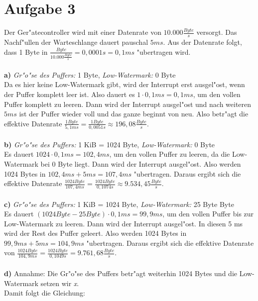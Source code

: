 \documentclass{ti2}
\begin{document}
\section*{Aufgabe 3}
Der Ger"atecontroller wird mit einer Datenrate von $10.000 \frac{Byte}{s}$ versorgt. Das Nachf"ullen der Warteschlange dauert pauschal $5ms$. Aus der Datenrate folgt, dass 1 Byte in $\frac{Byte}{10.000 \frac{Byte}{s}}=0,0001s=0,1ms$ "ubertragen wird.\\ 
\\
\textbf{a)} \textit{Gr"o"se des Puffers:} 1 Byte,     \textit{Low-Watermark:} 0 Byte\\
Da es hier keine Low-Watermark gibt, wird der Interrupt erst ausgel"ost, wenn der Puffer komplett leer ist. Also dauert es $1 \cdot 0,1ms=0,1ms$, um den vollen Puffer komplett zu leeren. Dann wird der Interrupt ausgel"ost und nach weiteren $5ms$ ist der Puffer wieder voll und das ganze beginnt von neu. Also betr"agt die effektive Datenrate $\frac{1 Byte}{5,1 ms}=\frac{1 Byte}{0,0051s}\approx 196,08 \frac{Byte}{s}$.\\ 
\\
\textbf{b)} \textit{Gr"o"se des Puffers:} 1 KiB = 1024 Byte,    \textit{Low-Watermark:} 0 Byte\\
Es dauert $1024 \cdot 0,1 ms = 102,4 ms$, um den vollen Puffer zu leeren, da die Low-Watermark bei 0 Byte liegt. Dann wird der Interrupt ausgel"ost. Also werden 1024 Bytes in $102,4 ms + 5 ms= 107,4 ms$ "ubertragen. Daraus ergibt sich die effektive Datenrate $\frac{1024 Byte}{107,4 ms}= \frac{1024 Byte}{0,1074s}\approx 9.534,45 \frac{Byte}{s}$.\\
\\
\textbf{c)} \textit{Gr"o"se des Puffers:} 1 KiB = 1024 Byte,    \textit{Low-Watermark:} 25 Byte Byte\\
Es dauert $(1024 Byte-25 Byte) \cdot 0,1 ms=99,9 ms$, um den vollen Puffer bis zur Low-Watermark zu leeren. Dann wird der Interrupt ausgel"ost. In diesen 5 ms wird der Rest des Puffer geleert. Also werden 1024 Bytes in $99,9 ms +5 ms=104,9 ms$ "ubertragen. Daraus ergibt sich die effektive Datenrate von $\frac{1024 Byte}{104,9 ms}=\frac{1024 Byte}{0,1049s}=9.761,68 \frac{Byte}{s}$.\\
\\
\textbf{d)} Annahme: Die Gr"o"se des Puffers betr"agt weiterhin 1024 Bytes und die Low-Watermark setzen wir \textit{x}.\\
Damit folgt die Gleichung:
\end{document}
